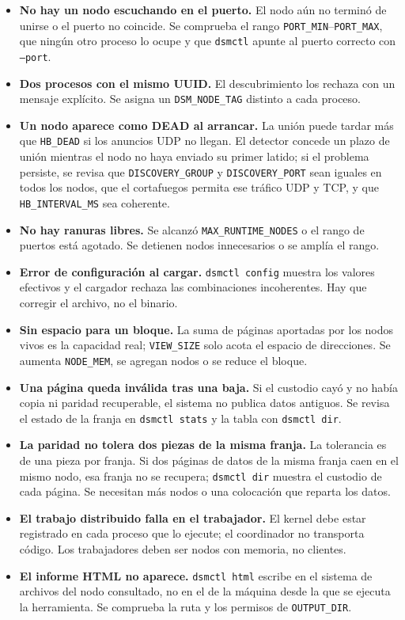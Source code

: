 \documentclass[11pt,spanish]{article}
\begin{document}
\begin{itemize}[leftmargin=1.5em, itemsep=0.3em]
    \item \textbf{No hay un nodo escuchando en el puerto.} El nodo aún no terminó de unirse o el puerto no coincide. Se comprueba el rango \texttt{PORT\_MIN}--\texttt{PORT\_MAX}, que ningún otro proceso lo ocupe y que \texttt{dsmctl} apunte al puerto correcto con \texttt{--port}.
    \item \textbf{Dos procesos con el mismo UUID.} El descubrimiento los rechaza con un mensaje explícito. Se asigna un \texttt{DSM\_NODE\_TAG} distinto a cada proceso.
    \item \textbf{Un nodo aparece como DEAD al arrancar.} La unión puede tardar más que \texttt{HB\_DEAD} si los anuncios UDP no llegan. El detector concede un plazo de unión mientras el nodo no haya enviado su primer latido; si el problema persiste, se revisa que \texttt{DISCOVERY\_GROUP} y \texttt{DISCOVERY\_PORT} sean iguales en todos los nodos, que el cortafuegos permita ese tráfico UDP y TCP, y que \texttt{HB\_INTERVAL\_MS} sea coherente.
    \item \textbf{No hay ranuras libres.} Se alcanzó \texttt{MAX\_RUNTIME\_NODES} o el rango de puertos está agotado. Se detienen nodos innecesarios o se amplía el rango.
    \item \textbf{Error de configuración al cargar.} \texttt{dsmctl config} muestra los valores efectivos y el cargador rechaza las combinaciones incoherentes. Hay que corregir el archivo, no el binario.
    \item \textbf{Sin espacio para un bloque.} La suma de páginas aportadas por los nodos vivos es la capacidad real; \texttt{VIEW\_SIZE} solo acota el espacio de direcciones. Se aumenta \texttt{NODE\_MEM}, se agregan nodos o se reduce el bloque.
    \item \textbf{Una página queda inválida tras una baja.} Si el custodio cayó y no había copia ni paridad recuperable, el sistema no publica datos antiguos. Se revisa el estado de la franja en \texttt{dsmctl stats} y la tabla con \texttt{dsmctl dir}.
    \item \textbf{La paridad no tolera dos piezas de la misma franja.} La tolerancia es de una pieza por franja. Si dos páginas de datos de la misma franja caen en el mismo nodo, esa franja no se recupera; \texttt{dsmctl dir} muestra el custodio de cada página. Se necesitan más nodos o una colocación que reparta los datos.
    \item \textbf{El trabajo distribuido falla en el trabajador.} El kernel debe estar registrado en cada proceso que lo ejecute; el coordinador no transporta código. Los trabajadores deben ser nodos con memoria, no clientes.
    \item \textbf{El informe HTML no aparece.} \texttt{dsmctl html} escribe en el sistema de archivos del nodo consultado, no en el de la máquina desde la que se ejecuta la herramienta. Se comprueba la ruta y los permisos de \texttt{OUTPUT\_DIR}.
\end{itemize}
\end{document}
